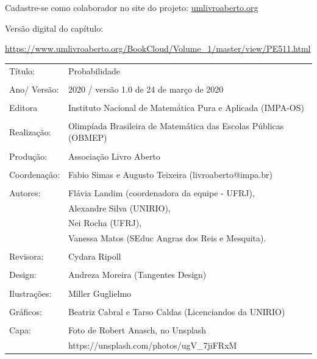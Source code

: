 \vspace*{.3cm}

Cadastre-se como colaborador no site do projeto: \url{umlivroaberto.org}

Versão digital do capítulo:

\url{https://www.umlivroaberto.org/BookCloud/Volume_1/master/view/PE511.html}


\begin{tabular}{p{}p{}}
Título: & Probabilidade\\
\\
Ano/ Versão: & 2020 / versão 1.0 de 24 de março de 2020\\
\\
Editora & Instituto Nacional de Matem\'atica Pura e Aplicada (IMPA-OS)\\
\\
Realização:& Olimp\'iada Brasileira de Matem\'atica das Escolas P\'ublicas (OBMEP)\\
\\
Produção:& Associação Livro Aberto\\
\\
Coordenação: & Fabio Simas e Augusto Teixeira (livroaberto@impa.br)\\
\\
  Autores: & Flávia Landim (coordenadora da equipe - UFRJ),\\
        & Alexandre Silva (UNIRIO),\\
        & Nei Rocha (UFRJ),\\
             & Vanessa Matos (SEduc Angras dos Reis e Mesquita).\\
\\
Revisora: &  Cydara Ripoll  \\
\\
Design: & Andreza Moreira (Tangentes Design) \\
\\
  Ilustrações: & Miller  Guglielmo \\ 
\\
Gráficos: & Beatriz Cabral e Tarso Caldas (Licenciandos da UNIRIO)\\
\\
  Capa: & Foto de Robert Anasch, no Unsplash \\
        & https://unsplash.com/photos/ugV\_7jiFRxM \\

\end{tabular}

